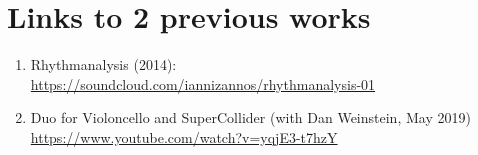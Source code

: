 
\section*{Links to 2 previous works}
\label{sec:orgc508e9a}
\begin{enumerate}
\item Rhythmanalysis (2014): \url{https://soundcloud.com/iannizannos/rhythmanalysis-01}
\item Duo for Violoncello and SuperCollider (with Dan Weinstein, May 2019) \url{https://www.youtube.com/watch?v=yqjE3-t7hzY}
\end{enumerate}
